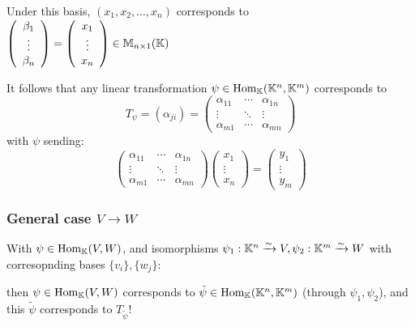 Under this basis, \((x_1, x_2, \ldots, x_n)\) corresponds to \(\left(\begin{array}{c}
        \beta_1 \\ \vdots \\ \beta_n
    \end{array}\right) = \left(\begin{array}{c}
        x_1 \\ \vdots \\ x_n
    \end{array}\right) \in \mathbb{M}_{n \times 1}(\mathbb{K})\)

It follows that any linear transformation \(\psi \in \mathrm{Hom}_{\mathbb{K}}(\mathbb{K}^n, \mathbb{K}^m)\) corresponds to \[T_\psi = (\alpha_{ji}) = \left(\begin{array}{ccc}
            \alpha_{11} & \cdots & \alpha_{1n} \\
            \vdots      & \ddots & \vdots      \\
            \alpha_{m1} & \cdots & \alpha_{mn}
        \end{array}\right)\]
with \(\psi\) sending: \[
    \left(\begin{array}{ccc}
            \alpha_{11} & \cdots & \alpha_{1n} \\
            \vdots      & \ddots & \vdots      \\
            \alpha_{m1} & \cdots & \alpha_{mn}
        \end{array}\right)\left(\begin{array}{c}
            x_1 \\ \vdots \\ x_n
        \end{array}\right) = \left(\begin{array}{c}
            y_1    \\
            \vdots \\
            y_m
        \end{array}\right)
\]

\subsubsection{General case \(V \to W\)}
With \(\psi \in \mathrm{Hom}_{\mathbb{K}}(V, W)\), and isomorphisms \(\psi_1: \mathbb{K}^n \xrightarrow{\sim} V, \psi_2: \mathbb{K}^m \xrightarrow{\sim} W\) with corresopnding bases \(\{v_i\}, \{w_j\}\):


then \(\psi \in \mathrm{Hom}_{\mathbb{K}}(V, W)\) corresponds to \(\tilde{\psi} \in \mathrm{Hom}_{\mathbb{K}}(\mathbb{K}^n, \mathbb{K}^m)\)  (through \(\psi_1, \psi_2\)), and this \(\tilde{\psi}\) corresponds to \(T_{\tilde{\psi}}\)!


